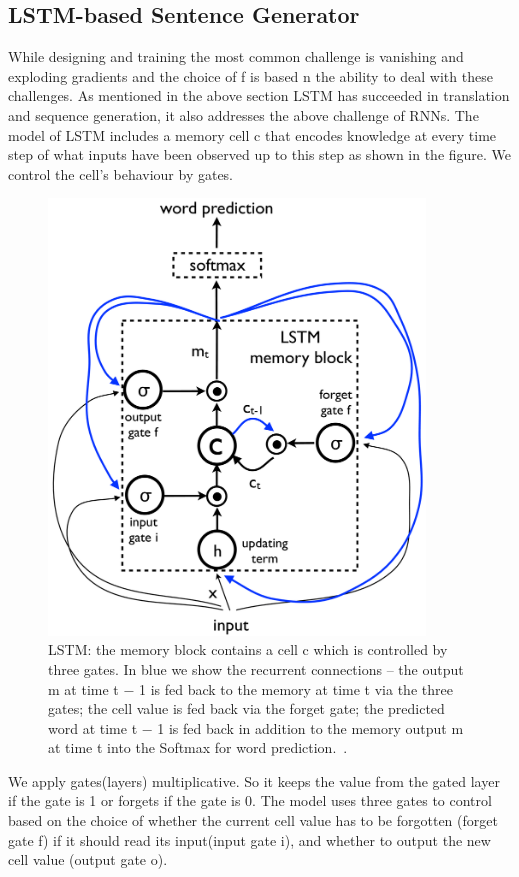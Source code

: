 \documentclass[a4paper,UKenglish,cleveref, autoref, thm-restate]{lipics-v2021}
\begin{document}
\subsection{LSTM-based Sentence Generator}
While designing and training the most common challenge is vanishing and exploding gradients and the choice of f is based n the ability to deal with these challenges.
As mentioned in the above section LSTM has succeeded in translation and sequence generation, it also addresses the above challenge of RNNs.
The model of LSTM includes a memory cell c that encodes knowledge at every time step of what inputs have been observed up to this step as shown in the figure. We control the cell’s behaviour by gates.
\begin{figure}[ht]
    \centering
    \includegraphics[width=10cm]{images/softmax lstm.png}
    \caption{ LSTM: the memory block contains a cell c which is
controlled by three gates. In blue we show the recurrent connections – the output m at time t − 1 is fed back to the memory at
time t via the three gates; the cell value is fed back via the forget
gate; the predicted word at time t − 1 is fed back in addition to the
memory output m at time t into the Softmax for word prediction.~\cite{}.}
    \label{fig:}
\end{figure}
We apply gates(layers) multiplicative. So it keeps the value from the gated layer if the gate is 1 or forgets if the gate is 0.
The model uses three gates to control based on the choice of whether the current cell value has to be forgotten (forget gate f) if it should read its input(input gate i), and whether to output the new cell value (output gate o).
\end{document}
